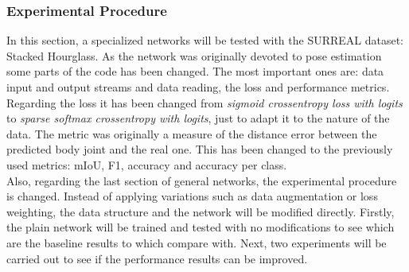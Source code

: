 \subsubsection{Experimental Procedure}

In this section, a specialized networks will be tested with the SURREAL dataset: Stacked Hourglass. As the network was originally devoted to pose estimation some parts of the code has been changed. The most important ones are: data input and output streams and data reading, the loss and performance metrics. Regarding the loss it has been changed from \textit{sigmoid crossentropy loss with logits} to \textit{sparse softmax crossentropy with logits}, just to adapt it to the nature of the data. The metric was originally a measure of the distance error between the predicted body joint and the real one. This has been changed to the previously used metrics: mIoU, F1, accuracy and accuracy per class.\\

Also, regarding the last section of general networks, the experimental procedure is changed. Instead of applying variations such as data augmentation or loss weighting, the data structure and the network will be modified directly. Firstly, the plain network will be trained and tested with no modifications to see which are the baseline results to which compare with. Next, two experiments will be carried out to see if the performance results can be improved.\\

